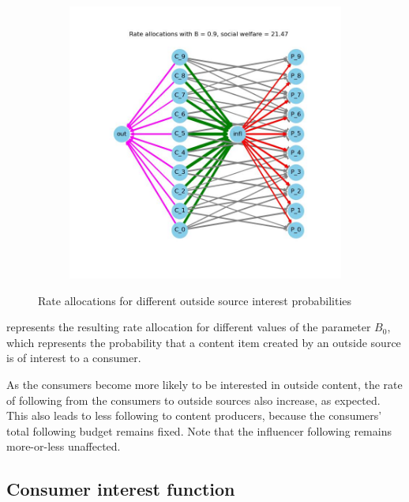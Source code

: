 \documentclass[11pt, letterpaper]{article}
\begin{document}
\begin{figure}[h]
\begin{adjustbox}{max width=1.5\textwidth,center}
\begin{subfigure}[b]{0.45\textwidth}
    \end{subfigure}
    \begin{subfigure}[b]{0.45\textwidth}
        \includegraphics[width=\linewidth]{figures/B_0/0.9_allocs.jpg}
    \end{subfigure}
\end{adjustbox}
\caption{Rate allocations for different outside source interest probabilities}
\label{fig:B_0}
\end{figure}

 represents the resulting rate allocation for different values of the parameter \(B_0\), which represents the probability that a content item created by an outside source is of interest to a consumer.

As the consumers become more likely to be interested in outside content, the rate of following from the consumers to outside sources also increase, as expected. This also leads to less following to content producers, because the consumers' total following budget remains fixed. Note that the influencer following remains more-or-less unaffected.

\subsection{Consumer interest function}
\end{document}
